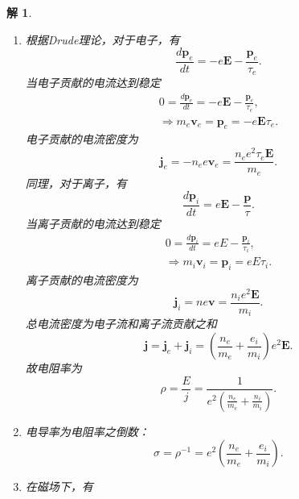 \documentclass[UTF8,10pt,a4paper]{article}
\theoremstyle{Problem}
\theoremstyle{Solution}
\newtheorem*{sol}{解}
\begin{document}
\begin{sol}
    \begin{enumerate}
        \item[(a)] 根据Drude理论，对于电子，有
        \begin{equation}
            \frac{d\bm{p}_e}{dt}=-e\bm{E}-\frac{\bm{p}_e}{\tau_e}.
        \end{equation}
        当电子贡献的电流达到稳定
        \begin{gather}
            0=\frac{d\bm{p}_e}{dt}=-e\bm{E}-\frac{\bm{p}_e}{\tau_e},\\
            \Longrightarrow m_e\bm{v}_e=\bm{p}_e=-e\bm{E}\tau_e.
        \end{gather}
        电子贡献的电流密度为
        \begin{equation}
            \bm{j}_e=-n_ee\bm{v}_e=\frac{n_ee^2\tau_e\bm{E}}{m_e}.
        \end{equation}
        同理，对于离子，有
        \begin{equation}
            \frac{d\bm{p}_i}{dt}=e\bm{E}-\frac{\bm{p}}{\tau}.
        \end{equation}
        当离子贡献的电流达到稳定
        \begin{gather}
            0=\frac{d\bm{p}_i}{dt}=eE-\frac{\bm{p}_i}{\tau_i},\\
            \Longrightarrow m_i\bm{v}_i=\bm{p}_i=eE\tau_i.
        \end{gather}
        离子贡献的电流密度为
        \begin{equation}
            \bm{j}_i=ne\bm{v}=\frac{n_ie^2\bm{E}}{m_i}.
        \end{equation}
        总电流密度为电子流和离子流贡献之和
        \begin{equation}
            \bm{j}=\bm{j}_e+\bm{j}_i=\left(\frac{n_e}{m_e}+\frac{e_i}{m_i}\right)e^2\bm{E}.
        \end{equation}
        故电阻率为
        \begin{equation}
            \rho=\frac{E}{j}=\frac{1}{e^2\left(\frac{n_e}{m_e}+\frac{n_i}{m_i}\right)}.
        \end{equation}
        \item[(b)] 电导率为电阻率之倒数：
        \begin{equation}
            \sigma=\rho^{-1}=e^2\left(\frac{n_e}{m_e}+\frac{e_i}{m_i}\right).
        \end{equation}
        \item[(c)] 在磁场下，有
        \begin{gather}

\end{gather}
\end{enumerate}
\end{sol}
\end{document}
